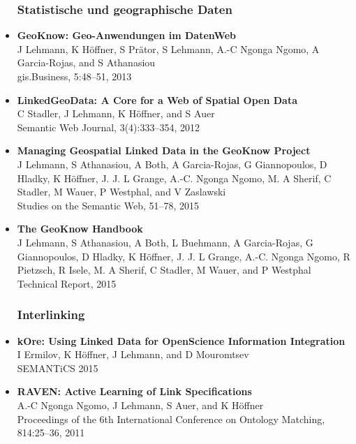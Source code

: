\documentclass{article}
\begin{document}
\begin{itemize}
\subsubsection*{Statistische und geographische Daten}

\item \textbf{GeoKnow: {G}eo-{A}nwendungen im {D}aten{W}eb}~\\
J Lehmann, K Höffner, S Prätor, S Lehmann, A.-C Ngonga Ngomo, A Garcia-Rojas, and S Athanasiou\\
gis.Business, 5:48--51, 2013

\item \textbf{LinkedGeoData: A Core for a Web of Spatial Open Data}~\\
C Stadler, J Lehmann, K Höffner, and S Auer\\
Semantic Web Journal, 3(4):333--354, 2012

\item \textbf{Managing Geospatial Linked Data in the GeoKnow Project}~\\
J Lehmann, S Athanasiou, A Both, A Garcia-Rojas, G Giannopoulos,
D Hladky, K Höffner, J. J. L Grange, A.-C. Ngonga Ngomo, M. A Sherif, C Stadler,
M Wauer, P Westphal, and V Zaslawski\\
Studies on the Semantic Web, 51--78, 2015

\item \textbf{The GeoKnow Handbook}~\\
J Lehmann, S Athanasiou, A Both, L Buehmann, A Garcia-Rojas, G Giannopoulos, D Hladky, K Höffner, J. J. L Grange, A.-C. Ngonga Ngomo, R Pietzsch, R Isele, M. A Sherif, C Stadler, M Wauer, and P Westphal\\
Technical Report, 2015


\subsubsection*{Interlinking}

\item \textbf{kOre: Using Linked Data for OpenScience Information Integration}~\\
I Ermilov, K Höffner, J Lehmann, and D Mouromtsev\\
SEMANTiCS 2015%

\item \textbf{RAVEN: Active Learning of Link Specifications}~\\
A.-C Ngonga Ngomo, J Lehmann, S Auer, and K Höffner\\
Proceedings of the 6th International Conference on Ontology Matching,\\
814:25--36, 2011


\end{itemize}
\end{document}
